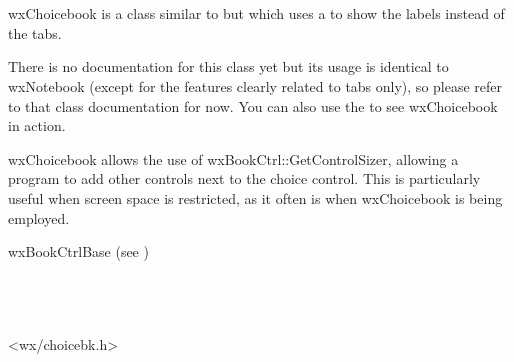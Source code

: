 
\section{}\label{wxchoicebook}

wxChoicebook is a class similar to  but which
uses a  to show the labels instead of the
tabs.

There is no documentation for this class yet but its usage is
identical to wxNotebook (except for the features clearly related to tabs
only), so please refer to that class documentation for now. You can also
use the  to see wxChoicebook in action.

wxChoicebook allows the use of wxBookCtrl::GetControlSizer, allowing a program
to add other controls next to the choice control. This is particularly useful
when screen space is restricted, as it often is when wxChoicebook is being employed.


wxBookCtrlBase (see )\\
\\
\\
\\


<wx/choicebk.h>




\twocolwidtha{5cm}
\begin{twocollist}\itemsep=0pt


\end{twocollist}

